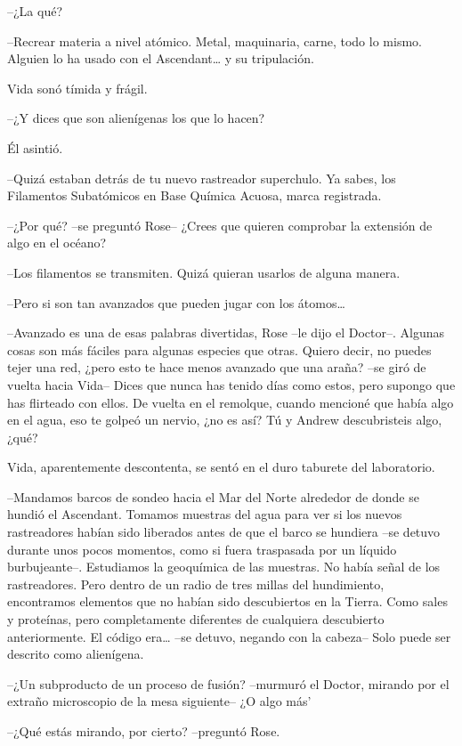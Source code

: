 {--¿La qué?}

{--Recrear materia a nivel atómico. Metal, maquinaria, carne, todo lo
 mismo. Alguien lo ha usado con el Ascendant\ldots{} y su tripulación.}

{Vida sonó tímida y frágil.}

{--¿Y dices que son alienígenas los que lo hacen?}

{Él asintió.}

{--Quizá estaban detrás de tu nuevo rastreador superchulo. Ya sabes, los
Filamentos Subatómicos en Base Química Acuosa, marca registrada.}

{--¿Por qué? --se preguntó Rose-- ¿Crees que quieren comprobar la
extensión de algo en el océano?}

{--Los filamentos se transmiten. Quizá quieran usarlos de alguna
manera.}

{--Pero si son tan avanzados que pueden jugar con los átomos\ldots{}}

{--Avanzado es una de esas palabras divertidas, Rose --le dijo el
 Doctor--. Algunas cosas son más fáciles para algunas especies que otras.
 Quiero decir, no puedes tejer una red, ¿pero esto te hace menos avanzado
 que una araña? --se giró de vuelta hacia Vida-- Dices que nunca has
 tenido días como estos, pero supongo que has flirteado con ellos. De
 vuelta en el remolque, cuando mencioné que había algo en el agua, eso te
golpeó un nervio, ¿no es así? Tú y Andrew descubristeis algo, ¿qué?}

{Vida, aparentemente descontenta, se sentó en el duro taburete del
laboratorio.}

{--Mandamos barcos de sondeo hacia el Mar del Norte alrededor de donde
 se hundió el Ascendant. Tomamos muestras del agua para ver si los nuevos
 rastreadores habían sido liberados antes de que el barco se hundiera
 --se detuvo durante unos pocos momentos, como si fuera traspasada por un
 líquido burbujeante--. Estudiamos la geoquímica de las muestras. No
 había señal de los rastreadores. Pero dentro de un radio de tres millas
 del hundimiento, encontramos elementos que no habían sido descubiertos
 en la Tierra. Como sales y proteínas, pero completamente diferentes de
 cualquiera descubierto anteriormente. El código era\ldots{} --se detuvo,
negando con la cabeza-- Solo puede ser descrito como alienígena.}

{--¿Un subproducto de un proceso de fusión? --murmuró el Doctor, mirando
por el extraño microscopio de la mesa siguiente-- ¿O algo más'}

{--¿Qué estás mirando, por cierto? --preguntó Rose.}

